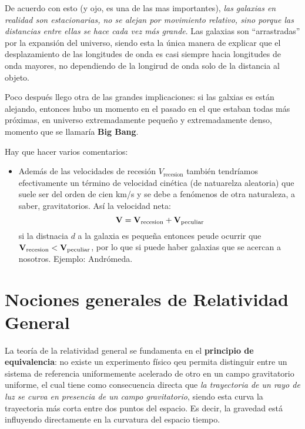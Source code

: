 De acuerdo con esto (y ojo, es una de las mas importantes), \textit{las galaxias en realidad son estacionarias, no se alejan por movimiento relativo, sino porque las distancias entre ellas se hace cada vez más grande}. Las galaxias son ``arrastradas'' por la expansión del universo, siendo esta la única manera de explicar que el desplazamiento de las longitudes de onda es casi siempre hacia longitudes de onda mayores, no dependiendo de la longirud de onda solo de la distancia al objeto.

Poco después llego otra de las grandes implicaciones: si las galxias es están alejando, entonces hubo un momento en el pasado en el que estaban todas más próximas, en universo extremadamente pequeño y extremadamente denso, momento que se llamaría \textbf{Big Bang}.

Hay que hacer varios comentarios:

\begin{itemize}
	\item Además de las velocidades de recesión $V_{\text{recesion}}$ también tendríamos efectivamente un término de velocidad cinética (de natuarelza aleatoria) que suele ser del orden de cien km/s y se debe a fenómenos de otra naturaleza, a saber, gravitatorios. Así la velocidad neta:
	      \begin{equation}
		      \mathbf{V} = \mathbf{V}_{\text{recesion}} + \mathbf{V}_{\text{peculiar}}
	      \end{equation}
	      si la distnacia $d$ a la galaxia es pequeña entonces peude ocurrir que $\mathbf{V}_{\text{recesion}}<\mathbf{V}_{\text{peculiar}}$, por lo que si puede haber galaxias que se acercan a nosotros. Ejemplo: Andrómeda.
\end{itemize}

\section{Nociones generales de Relatividad General}

La teoría de la relatividad general se fundamenta en el \textbf{principio de equivalencia}: no existe un experimento físico qeu permita distinguir entre un sistema de referencia uniformemente acelerado de otro en un campo gravitatorio uniforme, el cual tiene como consecuencia directa que \textit{la trayectoria de un rayo de luz se curva en presencia de un campo gravitatorio}, siendo esta curva la trayectoria más corta entre dos puntos del espacio. Es decir, la gravedad está influyendo directamente en la curvatura del espacio tiempo.

